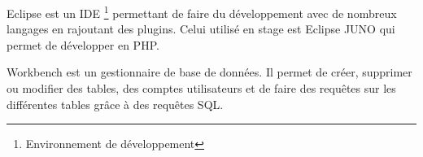 


		Eclipse est un IDE \footnote{Environnement de développement} permettant de faire du développement avec de nombreux langages en  rajoutant des plugins. Celui utilisé en stage est Eclipse JUNO qui permet de développer en PHP.



		Workbench est un gestionnaire de base de données. Il permet de créer, supprimer ou modifier des tables, des comptes utilisateurs et de faire des requêtes sur les différentes tables grâce à des requêtes SQL.





